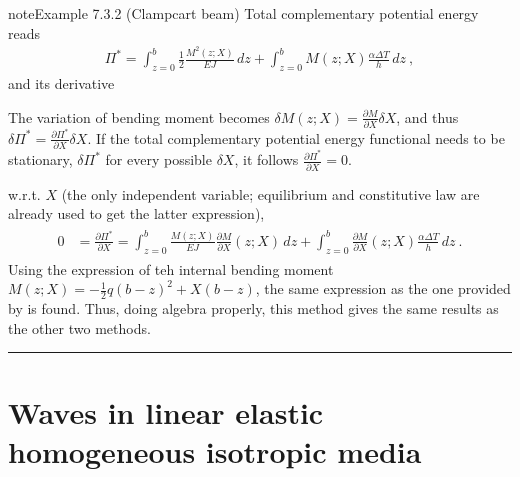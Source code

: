 \documentclass[letterpaper,10pt,english]{jupyterBook}
\begin{document}
\begin{sphinxadmonition}{note}{Example 7.3.2 (Clamp\sphinxhyphen{}cart beam)}
\sphinxAtStartPar
{} Total complementary potential energy reads
\begin{equation*}
\begin{split}\Pi^* = \int_{z=0}^{b} \frac{1}{2} \frac{M^2(z; X)}{EJ} \, dz + \int_{z=0}^{b} M(z; X) \frac{\alpha \Delta T}{h} \, dz \ ,\end{split}
\end{equation*}
\sphinxAtStartPar
and its derivative%
\begin{footnote}[1]\sphinxAtStartFootnote
The variation of bending moment becomes \(\delta M(z; X) = \frac{\partial M}{\partial X} \delta X\), and thus \(\delta \Pi^* = \frac{\partial \Pi^*}{\partial X} \delta X\). If the total complementary potential energy functional needs to be stationary, \(\delta \Pi^*\) for every possible \(\delta X\), it follows \(\frac{\partial \Pi^*}{\partial X} = 0\).
%
\end{footnote} w.r.t. \(X\) (the only independent variable; equilibrium and constitutive law are already used to get the latter expression),
\begin{equation*}
\begin{split}\begin{aligned}
  0 
  & = \frac{\partial \Pi^*}{\partial X} = \int_{z=0}^{b} \frac{M(z; X)}{EJ} \frac{\partial M}{\partial X}(z; X) \, dz + \int_{z=0}^{b} \frac{\partial M}{\partial X}(z;X) \frac{\alpha \Delta T}{h} \, dz \ .
\end{aligned}\end{split}
\end{equation*}
\sphinxAtStartPar
Using the expression of teh internal bending moment \(M(z; X) = -\frac{1}{2} q (b-z)^2 + X(b-z)\), the same expression as the one provided by  is found. Thus, doing algebra properly, this method gives the same results as the other two methods.
\end{sphinxadmonition}


\bigskip\hrule\bigskip


\sphinxstepscope


\chapter{Waves in linear elastic homogeneous isotropic media}
\label{\detokenize{ch/solids/small-displacements-waves:waves-in-linear-elastic-homogeneous-isotropic-media}}\label{\detokenize{ch/solids/small-displacements-waves:solid-mechanics-intro-small-displacements-waves}}\label{\detokenize{ch/solids/small-displacements-waves::doc}}
\end{document}
